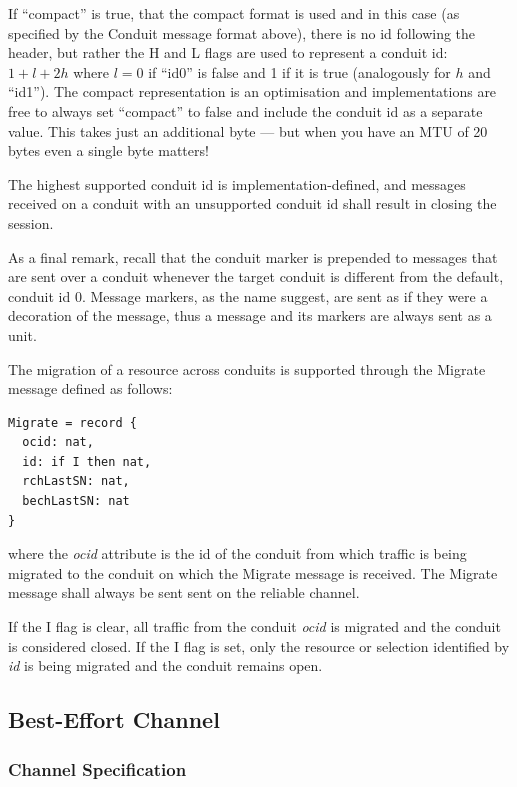 \documentclass[a4paper,oneside,article]{memoir}
\begin{document}
If ``compact'' is true, that the compact format is used and in this case (as specified by the
Conduit message format above), there is no id following the header, but rather the H and L flags are
used to represent a conduit id: $1 + l + 2h$ where $l = 0$ if ``id0'' is false and 1 if it is true
(analogously for $h$ and ``id1'').  The compact representation is an optimisation and
implementations are free to always set ``compact'' to false and include the conduit id as a separate
value.  This takes just an additional byte --- but when you have an MTU of 20 bytes even a single
byte matters!

The highest supported conduit id is implementation-defined, and messages received on a conduit with
an unsupported conduit id shall result in closing the session.

As a final remark, recall that the conduit marker is prepended to messages that are sent over a
conduit whenever the target conduit is different from the default, conduit id 0.  Message markers,
as the name suggest, are sent as if they were a decoration of the message, thus a message and its
markers are always sent as a unit.

The migration of a resource across conduits is supported through the Migrate message defined as
follows:
\begin{verbatim}
Migrate = record {
  ocid: nat,
  id: if I then nat,
  rchLastSN: nat,
  bechLastSN: nat
}
\end{verbatim}
where the \emph{ocid} attribute is the id of the conduit from which traffic is being migrated to the conduit on which the Migrate message is received. The Migrate message shall always be sent sent on the reliable channel.

If the I flag is clear, all traffic from the conduit \emph{ocid} is migrated and the conduit is considered closed.  If the I flag is set, only the resource or selection identified by \emph{id} is being migrated and the conduit remains open.

\subsection{Best-Effort Channel}

\subsubsection{Channel Specification}
\end{document}
